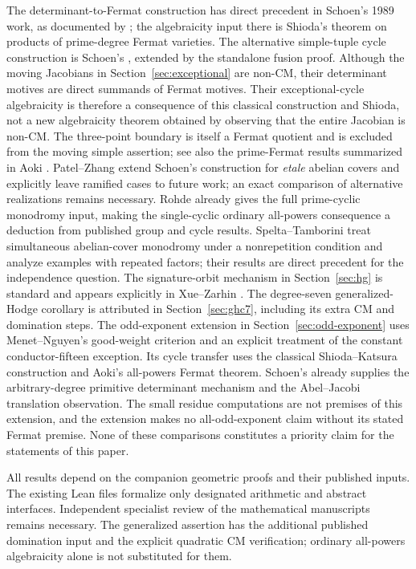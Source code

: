 \documentclass[11pt]{article}
\theoremstyle{definition}
\begin{document}
The determinant-to-Fermat construction has direct precedent in Schoen's
1989 work, as documented by \cite{Fermat}; the algebraicity input there is
Shioda's theorem on products of prime-degree Fermat varieties. The alternative
simple-tuple cycle construction is Schoen's
\cite{Schoen,SchoenAddendum}, extended by the standalone fusion proof.
Although the moving Jacobians in Section~\ref{sec:exceptional} are
non-CM, their determinant motives are direct summands of Fermat motives.
Their exceptional-cycle algebraicity is therefore a consequence of this
classical construction and Shioda, not a new algebraicity theorem obtained
by observing that the entire Jacobian is non-CM. The three-point boundary
is itself a Fermat quotient and is excluded from the moving simple assertion;
see also the prime-Fermat results summarized in Aoki \cite{AokiCM}.
Patel--Zhang \cite{PZ} extend Schoen's construction for
\emph{etale} abelian covers and explicitly leave ramified cases to future
work; an exact comparison of alternative realizations remains necessary.
Rohde \cite[Theorem 5.3.7]{Rohde} already gives the full prime-cyclic
monodromy input, making the single-cyclic ordinary all-powers consequence
a deduction from published group and cycle results. Spelta--Tamborini
\cite[Theorem 1.7 and Section 3]{ST} treat simultaneous abelian-cover
monodromy under a nonrepetition condition and analyze examples with
repeated factors; their results are direct precedent for the independence
question. The signature-orbit mechanism in Section~\ref{sec:hg} is
standard and appears explicitly in Xue--Zarhin \cite{XZ}.
The degree-seven generalized-Hodge corollary is attributed in
Section~\ref{sec:ghc7}, including its extra CM and domination steps.
The odd-exponent extension in Section~\ref{sec:odd-exponent} uses
Menet--Nguyen's good-weight criterion and an explicit treatment of the
constant conductor-fifteen exception. Its cycle transfer uses the
classical Shioda--Katsura construction and Aoki's all-powers Fermat
theorem. Schoen's \cite[Lemmas~1.1--1.2 and Remark~1.4]{Schoen}
already supplies the arbitrary-degree primitive determinant mechanism
and the Abel--Jacobi translation observation. The small residue
computations are not premises of this
extension, and the extension makes no all-odd-exponent claim without
its stated Fermat premise.
None of these comparisons
constitutes a priority claim for the statements of this paper.

All results depend on the companion geometric proofs and their published
inputs. The existing Lean files formalize only designated arithmetic and
abstract interfaces. Independent specialist review of the mathematical
manuscripts remains necessary. The generalized assertion has the additional
published domination input and the explicit quadratic CM verification;
ordinary all-powers algebraicity alone is not substituted for them.
\end{document}
